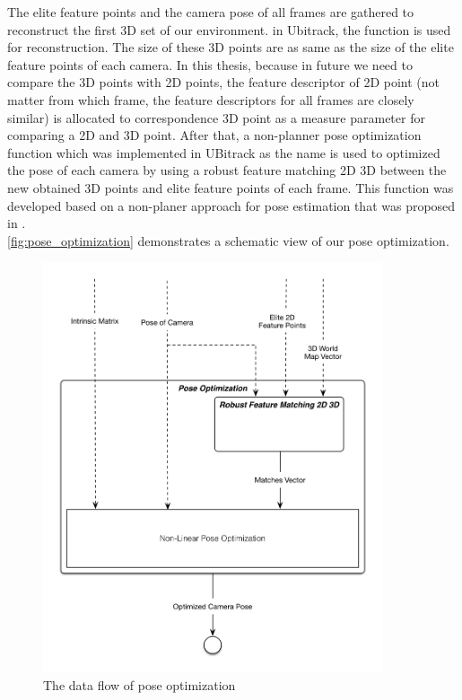 The elite feature points and the camera pose of all frames are gathered to reconstruct the first 3D set of our environment.
in Ubitrack, the  function is used for reconstruction. The size of these 3D points are as same as the size of the elite feature points of each camera. In this thesis, because in future we need to compare the 3D points with 2D points, the feature descriptor of 2D point (not matter from which frame, the feature descriptors for all frames are closely similar) is allocated to correspondence 3D point as a measure parameter for comparing a 2D and 3D point. After that, a non-planner pose optimization function which was implemented in UBitrack as the name  is used to optimized the pose of each camera by using a robust feature matching 2D 3D between the new obtained 3D points and elite feature points of each frame. This function was developed based on a non-planer approach for pose estimation that was proposed in \cite{lu2000fast}.\\
\autoref{fig:pose_optimization} demonstrates a schematic view of our pose optimization.
\begin{figure}[H]
  \centering
  \includegraphics[width=100mm]{figures/pose_optimization}
  \caption{The data flow of pose optimization}\label{fig:pose_optimization}
\end{figure}

